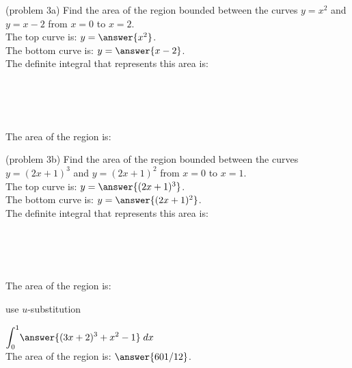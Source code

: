 \documentclass[handout]{ximera}
\begin{document}
\begin{problem}(problem 3a)
Find the area of the region bounded between the curves $y = x^2$ and $y = x - 2$ from $x = 0$ to $x = 2$.\\
The top curve is: $y = \answer{x^2}$.\\
The bottom curve is: $y = \answer{x - 2}$.\\
The definite integral that represents this area is: 

\begin{multipleChoice}
\\
\\
\\
\end{multipleChoice}

The area of the region is: 
\begin{multipleChoice}
\end{multipleChoice}

\end{problem}



\begin{problem}(problem 3b)
Find the area of the region bounded between the curves $y = (2x+1)^3$ and $y = (2x+1)^2$ from $x = 0$ to $x = 1$.\\
The top curve is: $y = \answer{(2x+1)^3}$.\\
The bottom curve is: $y = \answer{(2x+1)^2}$.\\
The definite integral that represents this area is: 

\begin{multipleChoice}
\\
\\
\\
\end{multipleChoice}

The area of the region is: 
\begin{hint}
use $u$-substitution
\end{hint}

\begin{multipleChoice}
\end{multipleChoice}




$\displaystyle{\int_0^1 } \answer{(3x+2)^3  + x^2 - 1} \; dx$\\
The area of the region is: $\answer{601/12}$.
\end{problem}
\end{document}
